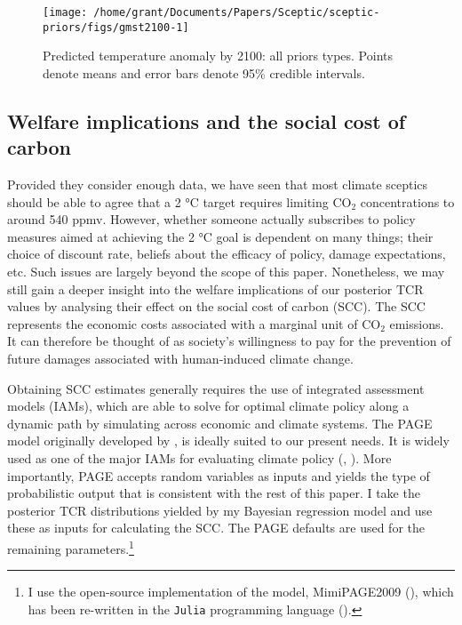 \documentclass[smallextended]{svjour3}       %
\begin{document}
\begin{figure}

{\centering \texttt{[image: /home/grant/Documents/Papers/Sceptic/sceptic-priors/figs/gmst2100-1]} 

}

\caption{Predicted temperature anomaly by 2100: all priors types. Points denote means and error bars denote 95\% credible intervals.}\label{fig:gmst2100}
\end{figure}

\hypertarget{sec:welfare}{%
\subsection{Welfare implications and the social cost of
carbon}\label{sec:welfare}}

Provided they consider enough data, we have seen that most climate
sceptics should be able to agree that a 2 °C target requires limiting
CO\(_2\) concentrations to around 540 ppmv. However, whether someone
actually subscribes to policy measures aimed at achieving the 2 °C goal
is dependent on many things; their choice of discount rate, beliefs
about the efficacy of policy, damage expectations, etc. Such issues are
largely beyond the scope of this paper. Nonetheless, we may still gain a
deeper insight into the welfare implications of our posterior TCR values
by analysing their effect on the social cost of carbon (SCC). The SCC
represents the economic costs associated with a marginal unit of
CO\(_2\) emissions. It can therefore be thought of as society's
willingness to pay for the prevention of future damages associated with
human-induced climate change.

Obtaining SCC estimates generally requires the use of integrated
assessment models (IAMs), which are able to solve for optimal climate
policy along a dynamic path by simulating across economic and climate
systems. The PAGE model originally developed by \cite{hope2011page09},
is ideally suited to our present needs. It is widely used as one of the
major IAMs for evaluating climate policy (\cite{nordhaus2014scc},
\cite{iwg2016scc}). More importantly, PAGE accepts random variables as
inputs and yields the type of probabilistic output that is consistent
with the rest of this paper. I take the posterior TCR distributions
yielded by my Bayesian regression model and use these as inputs for
calculating the SCC. The PAGE defaults are used for the remaining
parameters.\footnote{I use the open-source implementation of the model,
  MimiPAGE2009 (\cite{moore2018mimipage}), which has been re-written in
  the \texttt{Julia} programming language (\cite{julialang}).}
\end{document}
